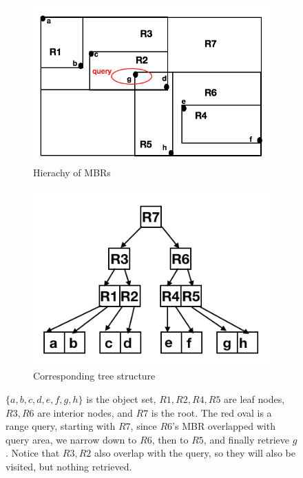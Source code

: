 \begin{figure}[htp]
  \centering
  \begin{subfigure}{.5\textwidth}
    \includegraphics[width=\linewidth]{pic/hierarchy_mbr.PNG}
    \caption{Hierachy of MBRs}
    \label{hmbr}
  \end{subfigure}%
  \begin{subfigure}{.5\textwidth}
    \includegraphics[width=\linewidth]{pic/rtree.PNG}
    \caption{Corresponding tree structure}
    \label{tree}
  \end{subfigure}
  \caption{\small $\{a,b,c,d,e,f,g,h\}$ is the object set,
  $R1,R2,R4,R5$ are leaf nodes, $R3,R6$ are interior nodes, and $R7$ is the root.
  The red oval is a range query, starting with $R7$, since $R6$'s MBR overlapped with query
  area, we narrow down to $R6$, then to $R5$, and finally retrieve $g$. Notice that $R3,R2$ also
  overlap with the query, so they will also be visited, but nothing retrieved.
  }
  \label{rtree}
\end{figure}

